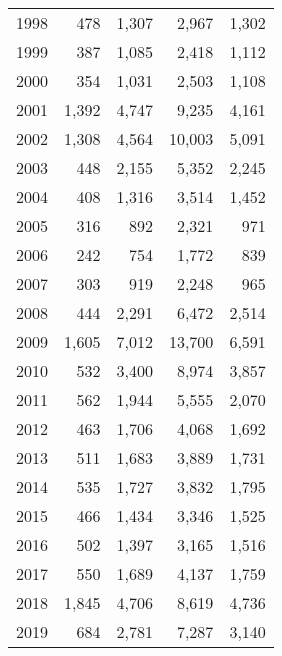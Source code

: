 \documentclass[11pt]{book}
\begin{document}
\begin{longtable}[]{@{}lrrrr@{}}
1998 & 478 & 1,307 & 2,967 & 1,302\tabularnewline
1999 & 387 & 1,085 & 2,418 & 1,112\tabularnewline
2000 & 354 & 1,031 & 2,503 & 1,108\tabularnewline
2001 & 1,392 & 4,747 & 9,235 & 4,161\tabularnewline
2002 & 1,308 & 4,564 & 10,003 & 5,091\tabularnewline
2003 & 448 & 2,155 & 5,352 & 2,245\tabularnewline
2004 & 408 & 1,316 & 3,514 & 1,452\tabularnewline
2005 & 316 & 892 & 2,321 & 971\tabularnewline
2006 & 242 & 754 & 1,772 & 839\tabularnewline
2007 & 303 & 919 & 2,248 & 965\tabularnewline
2008 & 444 & 2,291 & 6,472 & 2,514\tabularnewline
2009 & 1,605 & 7,012 & 13,700 & 6,591\tabularnewline
2010 & 532 & 3,400 & 8,974 & 3,857\tabularnewline
2011 & 562 & 1,944 & 5,555 & 2,070\tabularnewline
2012 & 463 & 1,706 & 4,068 & 1,692\tabularnewline
2013 & 511 & 1,683 & 3,889 & 1,731\tabularnewline
2014 & 535 & 1,727 & 3,832 & 1,795\tabularnewline
2015 & 466 & 1,434 & 3,346 & 1,525\tabularnewline
2016 & 502 & 1,397 & 3,165 & 1,516\tabularnewline
2017 & 550 & 1,689 & 4,137 & 1,759\tabularnewline
2018 & 1,845 & 4,706 & 8,619 & 4,736\tabularnewline
2019 & 684 & 2,781 & 7,287 & 3,140\tabularnewline
\bottomrule
\end{longtable}
\clearpage
\end{document}
